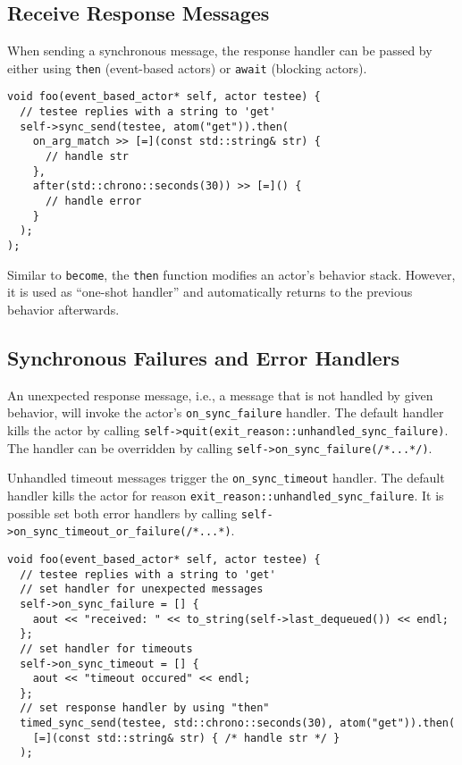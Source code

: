 \clearpage
\subsection{Receive Response Messages}

When sending a synchronous message, the response handler can be passed by either using \lstinline^then^ (event-based actors) or \lstinline^await^ (blocking actors).

\begin{lstlisting}
void foo(event_based_actor* self, actor testee) {
  // testee replies with a string to 'get'
  self->sync_send(testee, atom("get")).then(
    on_arg_match >> [=](const std::string& str) {
      // handle str
    },
    after(std::chrono::seconds(30)) >> [=]() {
      // handle error
    }
  );
);
\end{lstlisting}

Similar to \lstinline^become^, the \lstinline^then^ function modifies an actor's behavior stack.
However, it is used as ``one-shot handler'' and automatically returns to the previous behavior afterwards.

\subsection{Synchronous Failures and Error Handlers}

An unexpected response message, i.e., a message that is not handled by given behavior, will invoke the actor's \lstinline^on_sync_failure^ handler.
The default handler kills the actor by calling \lstinline^self->quit(exit_reason::unhandled_sync_failure)^.
The handler can be overridden by calling \lstinline^self->on_sync_failure(/*...*/)^.

Unhandled timeout messages trigger the \lstinline^on_sync_timeout^ handler.
The default handler kills the actor for reason \lstinline^exit_reason::unhandled_sync_failure^.
It is possible set both error handlers by calling \lstinline^self->on_sync_timeout_or_failure(/*...*)^.

\begin{lstlisting}
void foo(event_based_actor* self, actor testee) {
  // testee replies with a string to 'get'
  // set handler for unexpected messages
  self->on_sync_failure = [] {
    aout << "received: " << to_string(self->last_dequeued()) << endl;
  };
  // set handler for timeouts
  self->on_sync_timeout = [] {
    aout << "timeout occured" << endl;
  };
  // set response handler by using "then"
  timed_sync_send(testee, std::chrono::seconds(30), atom("get")).then(
    [=](const std::string& str) { /* handle str */ }
  );
\end{lstlisting}

